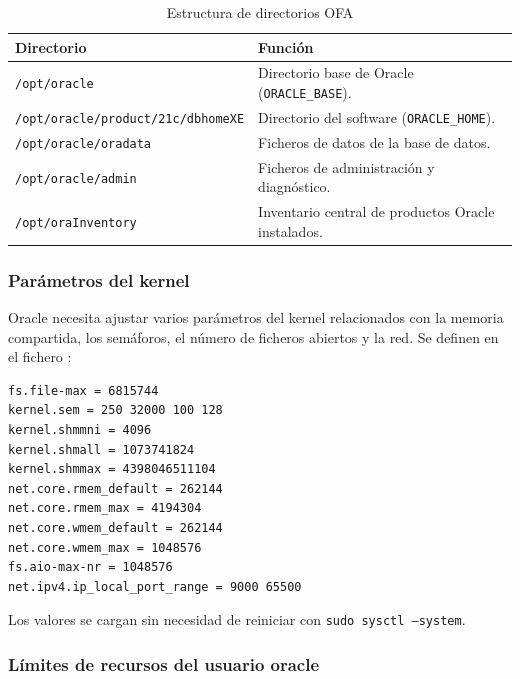 \begin{table}[!htbp]
    \centering
    \begin{tabularx}{\textwidth}{L{7cm} Y}
        \toprule
        \textbf{Directorio} & \textbf{Función} \\
        \midrule
        \texttt{/opt/oracle} & Directorio base de Oracle (\texttt{ORACLE\_BASE}). \\
        \texttt{/opt/oracle/product/21c/dbhomeXE} & Directorio del software (\texttt{ORACLE\_HOME}). \\
        \texttt{/opt/oracle/oradata} & Ficheros de datos de la base de datos. \\
        \texttt{/opt/oracle/admin} & Ficheros de administración y diagnóstico. \\
        \texttt{/opt/oraInventory} & Inventario central de productos Oracle instalados. \\
        \bottomrule
    \end{tabularx}
    \caption{Estructura de directorios OFA}
    \label{tab:ofa}
\end{table}

\subsubsection{Parámetros del kernel}

Oracle necesita ajustar varios parámetros del kernel relacionados con la memoria compartida, los semáforos, el número de ficheros abiertos y la red. Se definen en el fichero :

\begin{lstlisting}
fs.file-max = 6815744
kernel.sem = 250 32000 100 128
kernel.shmmni = 4096
kernel.shmall = 1073741824
kernel.shmmax = 4398046511104
net.core.rmem_default = 262144
net.core.rmem_max = 4194304
net.core.wmem_default = 262144
net.core.wmem_max = 1048576
fs.aio-max-nr = 1048576
net.ipv4.ip_local_port_range = 9000 65500
\end{lstlisting}

Los valores se cargan sin necesidad de reiniciar con \texttt{sudo sysctl --system}.


\subsubsection{Límites de recursos del usuario oracle}

